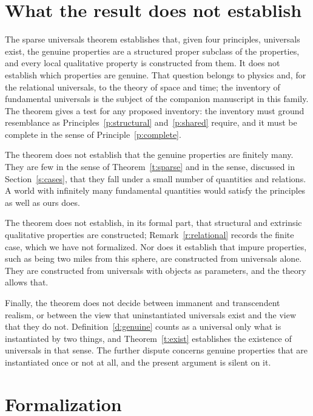 \documentclass{situationist-preprint}
\begin{document}
\section{What the result does not establish}\label{s:limits}

The sparse universals theorem establishes that, given four principles, universals exist, the genuine properties are a structured proper subclass of the properties, and every local qualitative property is constructed from them. It does not establish which properties are genuine. That question belongs to physics and, for the relational universals, to the theory of space and time; the inventory of fundamental universals is the subject of the companion manuscript in this family. The theorem gives a test for any proposed inventory: the inventory must ground resemblance as Principles~\ref{p:structural} and~\ref{p:shared} require, and it must be complete in the sense of Principle~\ref{p:complete}.

The theorem does not establish that the genuine properties are finitely many. They are few in the sense of Theorem~\ref{t:sparse} and in the sense, discussed in Section~\ref{s:cases}, that they fall under a small number of quantities and relations. A world with infinitely many fundamental quantities would satisfy the principles as well as ours does.

The theorem does not establish, in its formal part, that structural and extrinsic qualitative properties are constructed; Remark~\ref{r:relational} records the finite case, which we have not formalized. Nor does it establish that impure properties, such as being two miles from this sphere, are constructed from universals alone. They are constructed from universals with objects as parameters, and the theory allows that.

Finally, the theorem does not decide between immanent and transcendent realism, or between the view that uninstantiated universals exist and the view that they do not. Definition~\ref{d:genuine} counts as a universal only what is instantiated by two things, and Theorem~\ref{t:exist} establishes the existence of universals in that sense. The further dispute concerns genuine properties that are instantiated once or not at all, and the present argument is silent on it.

\section{Formalization}\label{s:formal}
\end{document}
